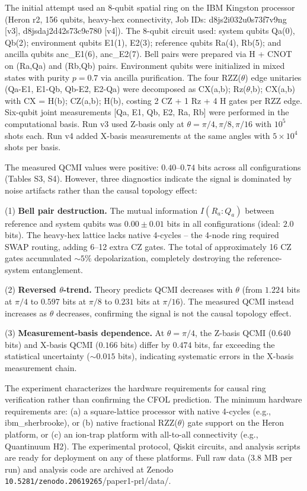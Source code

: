 \documentclass[aps,prl,showpacs]{revtex4-2}
\begin{document}
The initial attempt used an 8-qubit spatial ring on the IBM Kingston processor (Heron r2, 156 qubits, heavy-hex connectivity, Job IDs: d8js2i032u0s73f7v9ng [v3], d8jsdaj2d42s73c9e780 [v4]). The 8-qubit circuit used: system qubits Qa(0), Qb(2); environment qubits E1(1), E2(3); reference qubits Ra(4), Rb(5); and ancilla qubits anc\_E1(6), anc\_E2(7). Bell pairs were prepared via H + CNOT on (Ra,Qa) and (Rb,Qb) pairs. Environment qubits were initialized in mixed states with purity $p=0.7$ via ancilla purification. The four RZZ($\theta$) edge unitaries (Qa-E1, E1-Qb, Qb-E2, E2-Qa) were decomposed as CX(a,b); Rz($\theta$,b); CX(a,b) with CX = H(b); CZ(a,b); H(b), costing 2 CZ + 1 Rz + 4 H gates per RZZ edge. Six-qubit joint measurements [Qa, E1, Qb, E2, Ra, Rb] were performed in the computational basis. Run v3 used Z-basis only at $\theta=\pi/4,\pi/8,\pi/16$ with $10^5$ shots each. Run v4 added X-basis measurements at the same angles with $5\times10^4$ shots per basis.

The measured QCMI values were positive: $0.40$--$0.74$ bits across all configurations (Tables S3, S4). However, three diagnostics indicate the signal is dominated by noise artifacts rather than the causal topology effect:

(1) \textbf{Bell pair destruction.} The mutual information $I(R_a:Q_a)$ between reference and system qubits was $0.00\pm0.01$ bits in all configurations (ideal: $2.0$ bits). The heavy-hex lattice lacks native 4-cycles -- the 4-node ring required SWAP routing, adding 6--12 extra CZ gates. The total of approximately 16 CZ gates accumulated $\sim5\%$ depolarization, completely destroying the reference-system entanglement.

(2) \textbf{Reversed $\theta$-trend.} Theory predicts QCMI decreases with $\theta$ (from $1.224$ bits at $\pi/4$ to $0.597$ bits at $\pi/8$ to $0.231$ bits at $\pi/16$). The measured QCMI instead increases as $\theta$ decreases, confirming the signal is not the causal topology effect.

(3) \textbf{Measurement-basis dependence.} At $\theta=\pi/4$, the Z-basis QCMI ($0.640$ bits) and X-basis QCMI ($0.166$ bits) differ by $0.474$ bits, far exceeding the statistical uncertainty ($\sim0.015$ bits), indicating systematic errors in the X-basis measurement chain.

The experiment characterizes the hardware requirements for causal ring verification rather than confirming the CFOL prediction. The minimum hardware requirements are: (a) a square-lattice processor with native 4-cycles (e.g., ibm\_sherbrooke), or (b) native fractional RZZ($\theta$) gate support on the Heron platform, or (c) an ion-trap platform with all-to-all connectivity (e.g., Quantinuum H2). The experimental protocol, Qiskit circuits, and analysis scripts are ready for deployment on any of these platforms. Full raw data (3.8 MB per run) and analysis code are archived at Zenodo \texttt{10.5281/zenodo.20619265}/paper1-prl/data/.
\end{document}
